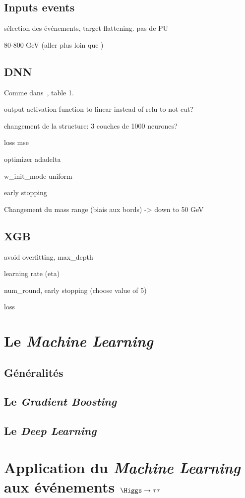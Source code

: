 \subsection*{Inputs events}
sélection des événements, target flattening. pas de PU

80-800 GeV (aller plus loin que \cite{BARTSCHI201929})
\subsection*{DNN}
Comme dans~\cite{BARTSCHI201929}, table 1.

output activation function to linear instead of relu to not cut?

changement de la structure: 3 couches de 1000 neurones?

loss mse

optimizer adadelta

w_init_mode uniform

early stopping

Changement du mass range (biais aux bords) -> down to 50 GeV

\subsection*{XGB}
avoid overfitting, max\_depth

learning rate (eta)

num\_round, early stopping (choose value of 5)

loss



\section{Le \emph{Machine Learning}}
\subsection{Généralités}
\subsection{Le \emph{Gradient Boosting}}
\subsection{Le \emph{Deep Learning}}

\section{Application du \emph{Machine Learning} aux événements $\Higgs\to\tau\tau$}
